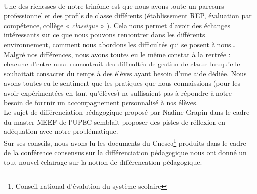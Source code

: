 \paragraph{} Une des richesses de notre trinôme est que nous avons toute un parcours professionnel et des profils de classe différents (établissement REP, évaluation par compétence, collège « \textit{classique} » ). Cela nous permet d'avoir des échanges intéressants sur ce que nous pouvons rencontrer dans les différents environnement, comment nous abordons les difficultés qui se posent à nous\ldots \\ 
Malgré nos différences, nous avons toutes eu le même constat à la rentrée : chacune d'entre nous rencontrait des difficultés de gestion de classe lorsqu'elle souhaitait consacrer du temps à des élèves ayant besoin d'une aide dédiée. Nous avons toutes eu le sentiment que les pratiques que nous connaissions (pour les avoir expérimentées en tant qu'élèves) ne suffisaient pas à répondre à notre besoin de fournir un accompagnement personnalisé à nos élèves.\\
Le sujet de différenciation pédagogique proposé par Nadine Grapin dans le cadre du master MEEF de l'UPEC semblait proposer des pistes de réflexion en adéquation avec notre problématique.\\
Sur ses conseils, nous avons lu les documents du Cnesco\footnote{Conseil national d'évalution du système scolaire} produits dans le cadre de la conférence consensus sur la différenciation pédagogique nous ont donné un tout nouvel éclairage sur la notion de différencation pédagogique.
